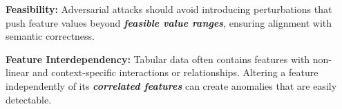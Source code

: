\documentclass[portrait,a0paper,margin=17mm,fontscale=0.292]{baposter}
\begin{document}
\begin{poster}
{\vspace{0.3em}
\textbf{\color{blue}Feasibility:} Adversarial attacks should avoid introducing perturbations that push feature values beyond \textbf{\textit{feasible value ranges}}, ensuring alignment with semantic correctness.

\vspace{0.3em}
\textbf{\color{blue}Feature Interdependency:} Tabular data often contains features with non-linear and context-specific interactions or relationships. Altering a feature independently of its \textbf{\textit{correlated features}} can create anomalies that are easily detectable.



}

\end{poster}
\end{document}
